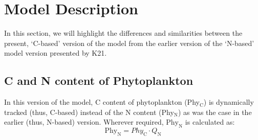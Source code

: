\documentclass[gmd, manuscript, draft]{copernicus}
\begin{document}

\section{Model Description}
In this section, we will highlight the differences and similarities between the present, `C-based' version of the model from the earlier version of the `N-based' model version presented by K21. 

\subsection{C and N content of Phytoplankton}
In this version of the model, C content of phytoplankton (Phy$_{\text{C}}$) is dynamically tracked (thus, C-based) instead of the N content (Phy$_{\text{N}}$) as was the case in the earlier (thus, N-based) version. Wherever required, $\text{Phy}_{\text{N}}$ is calculated as:
\begin{equation} \label{eq:Q}
  \text{Phy}_{\text{N}} = Phy_{\text{C}} \cdot Q_{\text{N}}  
\end{equation}
\end{document}
